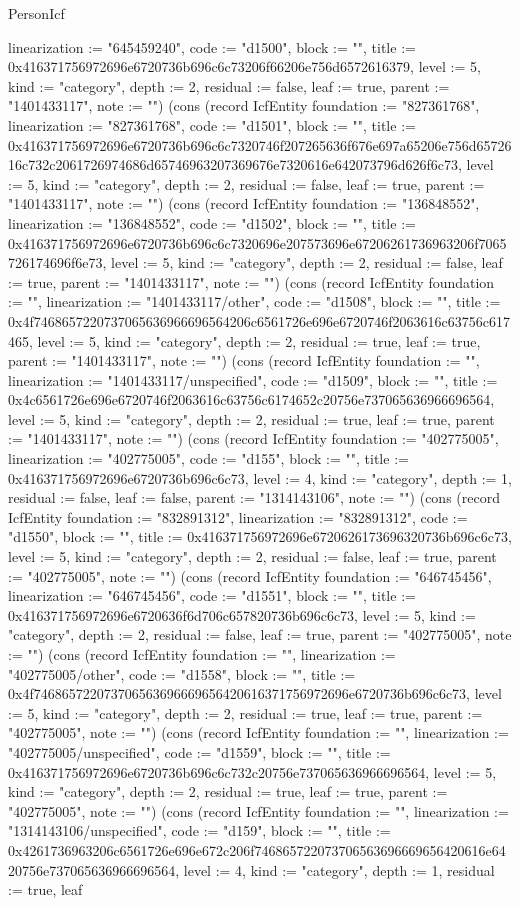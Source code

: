 \begin{lexlean}{PersonIcf}
\begin{semanticmodule}
{linearization := "645459240", code := "d1500", block := "", title := 0x416371756972696e6720736b696c6c73206f66206e756d6572616379, level := 5, kind := "category", depth := 2, residual := false, leaf := true, parent := "1401433117", note := ""}) (cons (record IcfEntity {foundation := "827361768", linearization := "827361768", code := "d1501", block := "", title := 0x416371756972696e6720736b696c6c7320746f207265636f676e697a65206e756d6572616c732c2061726974686d65746963207369676e7320616e642073796d626f6c73, level := 5, kind := "category", depth := 2, residual := false, leaf := true, parent := "1401433117", note := ""}) (cons (record IcfEntity {foundation := "136848552", linearization := "136848552", code := "d1502", block := "", title := 0x416371756972696e6720736b696c6c7320696e207573696e67206261736963206f7065726174696f6e73, level := 5, kind := "category", depth := 2, residual := false, leaf := true, parent := "1401433117", note := ""}) (cons (record IcfEntity {foundation := "", linearization := "1401433117/other", code := "d1508", block := "", title := 0x4f7468657220737065636966696564206c6561726e696e6720746f2063616c63756c617465, level := 5, kind := "category", depth := 2, residual := true, leaf := true, parent := "1401433117", note := ""}) (cons (record IcfEntity {foundation := "", linearization := "1401433117/unspecified", code := "d1509", block := "", title := 0x4c6561726e696e6720746f2063616c63756c6174652c20756e737065636966696564, level := 5, kind := "category", depth := 2, residual := true, leaf := true, parent := "1401433117", note := ""}) (cons (record IcfEntity {foundation := "402775005", linearization := "402775005", code := "d155", block := "", title := 0x416371756972696e6720736b696c6c73, level := 4, kind := "category", depth := 1, residual := false, leaf := false, parent := "1314143106", note := ""}) (cons (record IcfEntity {foundation := "832891312", linearization := "832891312", code := "d1550", block := "", title := 0x416371756972696e6720626173696320736b696c6c73, level := 5, kind := "category", depth := 2, residual := false, leaf := true, parent := "402775005", note := ""}) (cons (record IcfEntity {foundation := "646745456", linearization := "646745456", code := "d1551", block := "", title := 0x416371756972696e6720636f6d706c657820736b696c6c73, level := 5, kind := "category", depth := 2, residual := false, leaf := true, parent := "402775005", note := ""}) (cons (record IcfEntity {foundation := "", linearization := "402775005/other", code := "d1558", block := "", title := 0x4f746865722073706563696669656420616371756972696e6720736b696c6c73, level := 5, kind := "category", depth := 2, residual := true, leaf := true, parent := "402775005", note := ""}) (cons (record IcfEntity {foundation := "", linearization := "402775005/unspecified", code := "d1559", block := "", title := 0x416371756972696e6720736b696c6c732c20756e737065636966696564, level := 5, kind := "category", depth := 2, residual := true, leaf := true, parent := "402775005", note := ""}) (cons (record IcfEntity {foundation := "", linearization := "1314143106/unspecified", code := "d159", block := "", title := 0x4261736963206c6561726e696e672c206f746865722073706563696669656420616e6420756e737065636966696564, level := 4, kind := "category", depth := 1, residual := true, leaf }
\end{semanticmodule}
\end{lexlean}
